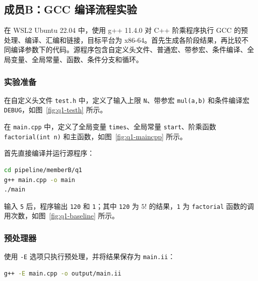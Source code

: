 \subsection{成员B：GCC 编译流程实验}

在 WSL2 Ubuntu 22.04 中，使用 g++ 11.4.0 对 C++ 阶乘程序执行 GCC 的预处理、编译、汇编和链接，目标平台为 x86-64。首先生成各阶段结果，再比较不同编译参数下的代码。源程序包含自定义头文件、普通宏、带参宏、条件编译、全局变量、全局常量、函数、条件分支和循环。

\subsubsection{实验准备}

在自定义头文件 \texttt{test.h} 中，定义了输入上限 \texttt{N}、带参宏 \texttt{mul(a,b)} 和条件编译宏 \texttt{DEBUG}，如图~\ref{fig:q1-testh} 所示。


在 \texttt{main.cpp} 中，定义了全局变量 \texttt{times}、全局常量 \texttt{start}、阶乘函数 \texttt{factorial(int n)} 和主函数，如图~\ref{fig:q1-maincpp} 所示。



首先直接编译并运行源程序：

\begin{lstlisting}[language=bash]
cd pipeline/memberB/q1
g++ main.cpp -o main
./main
\end{lstlisting}

输入 \texttt{5} 后，程序输出 \texttt{120} 和 \texttt{1}；其中 \texttt{120} 为 $5!$ 的结果，\texttt{1} 为 \texttt{factorial} 函数的调用次数，如图~\ref{fig:q1-baseline} 所示。



\subsubsection{预处理器}

使用 \texttt{-E} 选项只执行预处理，并将结果保存为 \texttt{main.ii}：

\begin{lstlisting}[language=bash]
g++ -E main.cpp -o output/main.ii
\end{lstlisting}

